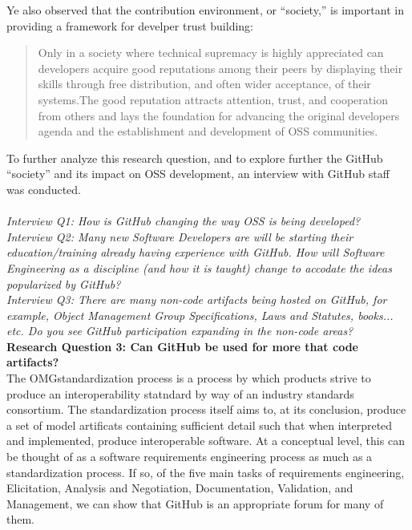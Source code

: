 \documentclass{proc}
\begin{document}
Ye also observed\cite{ye2003toward} that the contribution environment, or ``society,'' is important in providing a framework for develper trust building:
\begin{quote}
Only in a society where technical supremacy is highly appreciated can developers acquire good reputations among their peers by displaying their skills through free distribution, and often wider acceptance, of their systems.The good reputation attracts attention, trust, and cooperation from others and lays the foundation for advancing the original developers agenda and the establishment and development of OSS communities. 
\end{quote}

To further analyze this research question, and to explore further the GitHub ``society'' and its impact on OSS development, an interview with GitHub staff was conducted.\\\\
\textit{Interview Q1: How is GitHub changing the way OSS is being developed?}\\

\textit{Interview Q2: Many new Software Developers are will be starting their education/training already having experience with GitHub. How will Software Engineering as a discipline (and how it is taught) change to accodate the ideas popularized by GitHub?}\\

\textit{Interview Q3: There are many non-code artifacts being hosted on GitHub, for example, Object Management Group Specifications, Laws and Statutes, books... etc. Do you see GitHub participation expanding in the non-code areas?}\\

\textbf{Research Question 3: Can GitHub be used for more that code artifacts?}\\
The OMG\textregistered standardization process is a process by which products strive to produce an interoperability statndard by way of an industry standards consortium.\cite{omgTechProcess}
The standardization process itself aims to, at its conclusion, produce a set of model artificats containing sufficient detail such that when interpreted and implemented, produce interoperable software.
At a conceptual level, this can be thought of as a software requirements engineering process as much as a standardization process. If so,  of the five main tasks of requirements engineering, Elicitation, Analysis and Negotiation, Documentation, Validation, and Management,\cite{sommerville1998requirements} we can show that GitHub is an appropriate forum for many of them.
\end{document}
